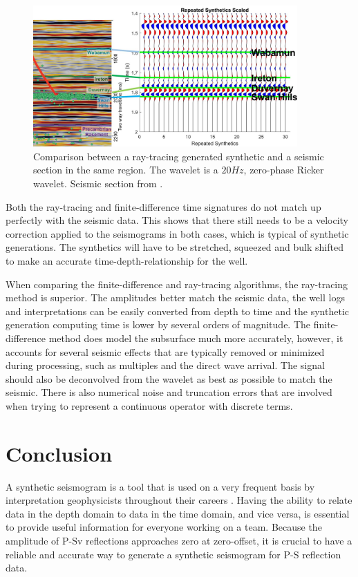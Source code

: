 \documentclass[12pt]{article}
\begin{document}
\begin{figure}[!htb]
	\centering
	\includegraphics[width=0.9\textwidth]{Figures/RTseisr.jpg}
	\caption[Fox Creek seismic ray-tracing comparison (Ricker wavelet)]{Comparison between a ray-tracing generated synthetic and a seismic section in the same region. The wavelet is a $20 Hz$, zero-phase Ricker wavelet. Seismic section from \cite{german2018}.}
	\label{fig:RTseisr}
\end{figure}

	Both the ray-tracing and finite-difference time signatures do not match up perfectly with the seismic data. This shows that there still needs to be a velocity correction applied to the seismograms in both cases, which is typical of synthetic generations. The synthetics will have to be stretched, squeezed and bulk shifted to make an accurate time-depth-relationship for the well.
	
	When comparing the finite-difference and ray-tracing algorithms, the ray-tracing method is superior. The amplitudes better match the seismic data, the well logs and interpretations can be easily converted from depth to time and the synthetic generation computing time is lower by several orders of magnitude. The finite-difference method does model the subsurface much more accurately, however, it accounts for several seismic effects that are typically removed or minimized during processing, such as multiples and the direct wave arrival. The signal should also be deconvolved from the wavelet as best as possible to match the seismic. There is also numerical noise and truncation errors that are involved when trying to represent a continuous operator with discrete terms. 

\section{Conclusion}

	A synthetic seismogram is a tool that is used on a very frequent basis by interpretation geophysicists throughout their careers . Having the ability to relate data in the depth domain to data in the time domain, and vice versa, is essential to provide useful information for everyone working on a team. Because the amplitude of P-Sv reflections approaches zero at zero-offset, it is crucial to have a reliable and accurate way to generate a synthetic seismogram for P-S reflection data. 
	
\end{document}
